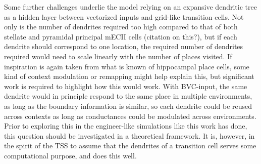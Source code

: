\documentclass{article}
\begin{document}
    Some further challenges underlie the model relying on an expansive dendritic tree as a hidden layer between vectorized inputs and grid-like transition cells. Not only is the number of dendrites required too high compared to that of both stellate and pyramidal principal mECII cells (citation on this?), but if each dendrite should correspond to one location, the required number of dendrites required would need to scale linearly with the number of places visited. If inspiration is again taken from what is known of hippocampal place cells, some kind of context modulation or remapping might help explain this, but significant work is required to highlight how this would work. With BVC-input, the same dendrite would in principle respond to the same place in multiple environments, as long as the boundary information is similar, so each dendrite could be reused across contexts as long as conductances could be modulated across environments. Prior to exploring this in the engineer-like simulations like this work has done, this question should be investigated in a theoretical framework.
    It is, however, in the spirit of the TSS to assume that the dendrites of a transition cell serves some computational purpose, and does this well.

    \printbibliography{}
\end{document}
